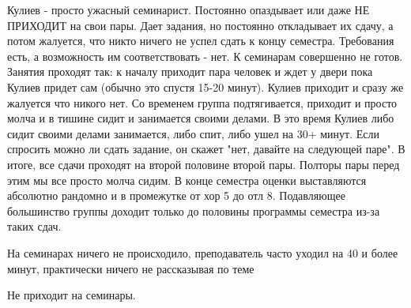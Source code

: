             \begin{commentbox} 
                Кулиев - просто ужасный семинарист. Постоянно опаздывает или даже НЕ ПРИХОДИТ на свои пары. Дает задания, но постоянно откладывает их сдачу, а потом жалуется, что никто ничего не успел сдать к концу семестра. Требования есть, а возможность им соответствовать - нет. К семинарам совершенно не готов. Занятия проходят так: к началу приходит пара человек и ждет у двери пока Кулиев придет сам (обычно это спустя 15-20 минут). Кулиев приходит и сразу же жалуется что никого нет. Со временем группа подтягивается, приходит и просто молча и в тишине сидит и занимается своими делами. В это время Кулиев либо сидит своими делами занимается, либо спит, либо ушел на 30+ минут. Если спросить можно ли сдать задание, он скажет "нет, давайте на следующей паре". В итоге, все сдачи проходят на второй половине второй пары. Полторы пары перед этим мы все просто молча сидим. В конце семестра оценки выставляются абсолютно рандомно и в промежутке от хор 5 до отл 8. Подавляющее большинство группы доходит только до половины программы семестра из-за таких сдач. 
            \end{commentbox} 
        
            \begin{commentbox} 
                На семинарах ничего не происходило, преподаватель часто уходил на 40 и более минут, практически ничего не рассказывая по теме 
            \end{commentbox} 
        
            \begin{commentbox} 
                Не приходит на семинары. 
            \end{commentbox}


    
